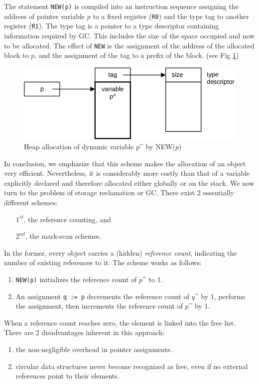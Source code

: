 The statement \verb|NEW(p)| is compiled into an instruction sequence assigning the address
of pointer variable $p$ to a fixed register (\verb|R0|) and the type tag to another register
(\verb|R1|). The type tag is a pointer to a type descriptor containing information required
by GC. This includes the size of the space occupied and now to be allocated. The effect of
\verb|NEW| is the assignment of the address of the allocated block to $p$, and the assignment
of the tag to a prefix of the block. (see Fig \ref{fig:allocation})
\begin{figure}[h!]
  \centering
  \includegraphics[width=\textwidth]{i/r}
  \caption{Heap allocation of dynamic variable $p$\^{} by NEW($p$)}
  \label{fig:allocation}
\end{figure}

In conclusion, we emphasize that this scheme makes the allocation of an object very efficient.
Nevertheless, it is considerably more costly than that of a variable explicitly declared
and therefore allocated either globally or on the stack. We now turn to the problem of
storage reclamation or GC. There exist 2 essentially different schemes:
\begin{itemize}
  \item[$1^{st}$,] the reference counting, and
  \item[$2^{nd}$,] the mark-scan schemes.
\end{itemize}
In the former, every object carries a (hidden) \emph{reference count}, indicating the number
of existing references to it. The scheme works as follows:
\begin{enumerate}
  \item \verb|NEW(p)| initializes the reference count of $p$\^{} to 1.
  \item An assignment \verb|q := p| decrements the reference count of $q$\^{} by 1, performs
    the assignment, then increments the reference count of $p$\^{} by 1.
\end{enumerate}
When a reference count reaches zero, the element is linked into the free list. There are 2
disadvantages inherent in this approach:
\begin{enumerate}
  \item the non-negligible overhead in pointer assignments.
  \item circular data structures never become recognized as free,
    even if no external references point to their elements.
\end{enumerate}

